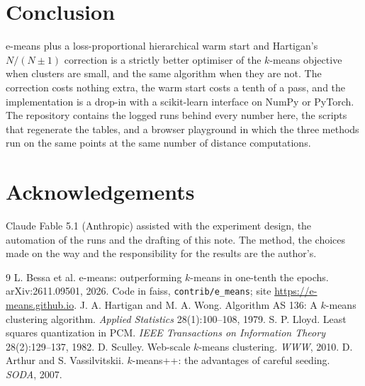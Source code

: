 \documentclass[11pt]{article}
\newcommand{\emeans}{e-means}
\begin{document}
\section{Conclusion}

\emeans{} plus a loss-proportional hierarchical warm start and Hartigan's $N/(N\pm1)$ correction is a strictly better optimiser of the $k$-means objective when clusters are small, and the same algorithm when they are not. The correction costs nothing extra, the warm start costs a tenth of a pass, and the implementation is a drop-in with a scikit-learn interface on NumPy or PyTorch. The repository contains the logged runs behind every number here, the scripts that regenerate the tables, and a browser playground in which the three methods run on the same points at the same number of distance computations.

\section*{Acknowledgements}
Claude Fable 5.1 (Anthropic) assisted with the experiment design, the automation of the runs and the drafting of this note. The method, the choices made on the way and the responsibility for the results are the author's.

\begin{thebibliography}{9}
 L. Bessa et al. e-means: outperforming $k$-means in one-tenth the epochs. arXiv:2611.09501, 2026. Code in faiss, \texttt{contrib/e\_means}; site \url{https://e-means.github.io}.
 J. A. Hartigan and M. A. Wong. Algorithm AS 136: A $k$-means clustering algorithm. \emph{Applied Statistics} 28(1):100--108, 1979.
 S. P. Lloyd. Least squares quantization in PCM. \emph{IEEE Transactions on Information Theory} 28(2):129--137, 1982.
 D. Sculley. Web-scale $k$-means clustering. \emph{WWW}, 2010.
 D. Arthur and S. Vassilvitskii. $k$-means++: the advantages of careful seeding. \emph{SODA}, 2007.
\end{thebibliography}
\end{document}
